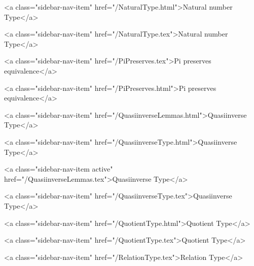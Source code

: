       
        
          <a class="sidebar-nav-item" href="/NaturalType.html">Natural number Type</a>
        
      
    
      
        
          <a class="sidebar-nav-item" href="/NaturalType.tex">Natural number Type</a>
        
      
    
      
        
          <a class="sidebar-nav-item" href="/PiPreserves.tex">Pi preserves equivalence</a>
        
      
    
      
        
          <a class="sidebar-nav-item" href="/PiPreserves.html">Pi preserves equivalence</a>
        
      
    
      
        
          <a class="sidebar-nav-item" href="/QuasiinverseLemmas.html">Quasiinverse Type</a>
        
      
    
      
        
          <a class="sidebar-nav-item" href="/QuasiinverseType.html">Quasiinverse Type</a>
        
      
    
      
        
          <a class="sidebar-nav-item active" href="/QuasiinverseLemmas.tex">Quasiinverse Type</a>
        
      
    
      
        
          <a class="sidebar-nav-item" href="/QuasiinverseType.tex">Quasiinverse Type</a>
        
      
    
      
        
          <a class="sidebar-nav-item" href="/QuotientType.html">Quotient Type</a>
        
      
    
      
        
          <a class="sidebar-nav-item" href="/QuotientType.tex">Quotient Type</a>
        
      
    
      
        
          <a class="sidebar-nav-item" href="/RelationType.tex">Relation Type</a>
        
